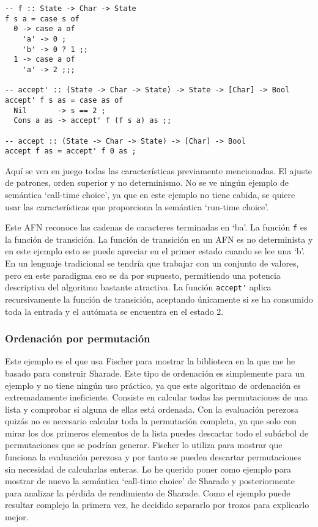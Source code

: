 \documentclass[class=article, crop=false]{standalone}
\begin{document}
\begin{verbatim}
-- f :: State -> Char -> State
f s a = case s of
  0 -> case a of
    'a' -> 0 ;
    'b' -> 0 ? 1 ;;
  1 -> case a of
    'a' -> 2 ;;;

-- accept' :: (State -> Char -> State) -> State -> [Char] -> Bool
accept' f s as = case as of
  Nil       -> s == 2 ;
  Cons a as -> accept' f (f s a) as ;;

-- accept :: (State -> Char -> State) -> [Char] -> Bool
accept f as = accept' f 0 as ;
\end{verbatim}

Aquí se ven en juego todas las características previamente mencionadas. El ajuste de
patrones, orden superior y no determinismo. No se ve ningún ejemplo de semántica `call-time
choice', ya que en este ejemplo no tiene cabida, se quiere usar las características que
proporciona la semántica `run-time choice'.

Este AFN reconoce las cadenas de caracteres terminadas en `ba'. La función \verb`f` es la
función de transición. La función de transición en un AFN es no determinista y en este
ejemplo esto se puede apreciar en el primer estado cuando se lee una `b'. En un lenguaje
tradicional se tendría que trabajar con un conjunto de valores, pero en este paradigma eso se
da por supuesto, permitiendo una potencia descriptiva del algoritmo bastante atractiva. La
función \verb`accept'` aplica recursivamente la función de transición, aceptando únicamente
si se ha consumido toda la entrada y el autómata se encuentra en el estado 2.

\subsubsection{Ordenación por permutación}

Este ejemplo es el que usa Fischer para mostrar la biblioteca en la que me he basado para
construir Sharade. Este tipo de ordenación es simplemente para un ejemplo y no tiene
ningún uso práctico, ya que este algoritmo de ordenación es extremadamente ineficiente.
Consiste en calcular todas las permutaciones de una lista y comprobar si alguna de ellas está
ordenada. Con la evaluación perezosa quizás no es necesario calcular toda la permutación
completa, ya que solo con mirar los dos primeros elementos de la lista puedes descartar todo
el subárbol de permutaciones que se podrían generar. Fischer lo utiliza para mostrar que
funciona la evaluación perezosa y por tanto se pueden descartar permutaciones sin necesidad
de calcularlas enteras. Lo he querido poner como ejemplo para mostrar de nuevo la semántica
`call-time choice' de Sharade y posteriormente para analizar la pérdida de rendimiento de
Sharade. Como el ejemplo puede resultar complejo la primera vez, he decidido separarlo por
trozos para explicarlo mejor.
\end{document}
